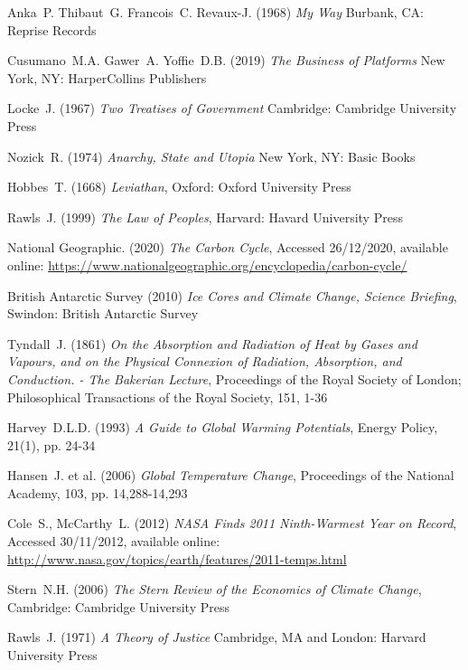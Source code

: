\documentclass[11pt, oneside]{book}   	%
\begin{document}
\pagebreak

\begin{thebibliography}{99}

 Anka~P. Thibaut~G. Francois~C. Revaux-J. (1968)
\emph{My Way}
Burbank, CA: Reprise Records

 Cusumano~M.A. Gawer~A. Yoffie~D.B. (2019)
\emph{The Business of Platforms}
New York, NY: HarperCollins Publishers

 Locke~J. (1967)
\emph{Two Treatises of Government}
Cambridge: Cambridge University Press

 Nozick~R. (1974)
\emph{Anarchy, State and Utopia}
New York, NY: Basic Books

 Hobbes~T. (1668)
\emph{Leviathan},
Oxford: Oxford University Press

 Rawls~J. (1999)
\emph{The Law of Peoples},
Harvard: Havard University Press

 National Geographic. (2020)
\emph{The Carbon Cycle},
Accessed 26/12/2020, available online: 
\url{https://www.nationalgeographic.org/encyclopedia/carbon-cycle/}
	
 British Antarctic Survey (2010)
\emph{Ice Cores and Climate Change, Science Briefing},
Swindon: British Antarctic Survey
	
 Tyndall~J. (1861)
\emph{On the Absorption and Radiation of Heat by Gases and Vapours, and on the Physical Connexion of Radiation, Absorption, and Conduction. - The Bakerian Lecture},
Proceedings of the Royal Society of London; Philosophical Transactions of the Royal Society, 151, 1-36
	
 Harvey~D.L.D. (1993)
\emph{A Guide to Global Warming Potentials},
Energy Policy, 21(1), pp. 24-34
	
 Hansen~J. et al. (2006)
\emph{Global Temperature Change},
Proceedings of the National Academy, 103, pp. 14,288-14,293
	
 Cole~S., McCarthy~L. (2012)
\emph{NASA Finds 2011 Ninth-Warmest Year on Record},
Accessed 30/11/2012, available online: 
\url{http://www.nasa.gov/topics/earth/features/2011-temps.html}
	
 Stern~N.H. (2006)
\emph{The Stern Review of the Economics of Climate Change},
Cambridge: Cambridge University Press
	
 Rawls~J. (1971)
\emph{A Theory of Justice}
Cambridge, MA and London: Harvard University Press
	

\end{thebibliography}
\end{document}
